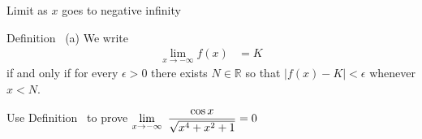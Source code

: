 
\begin{frame}[t]{Limit as $x$ goes to negative infinity}
\AnswerYes\MoreSpace{}
\begin{block}{Definition~ (a)}
We write
\begin{align*}
  \lim_{x \to -\infty} f(x) &= K
\end{align*}
if and only if for every $\epsilon>0$ there exists $N \in \mathbb{R}$ so that
$|f(x)-K| < \epsilon$ whenever $x<N$.
\end{block}
\textcolor{C1}{Use Definition~ to prove $\displaystyle\lim_{x \to -\infty}~\frac{\cos x}{\sqrt{x^4+x^2+1}}=0$}
\end{frame}
